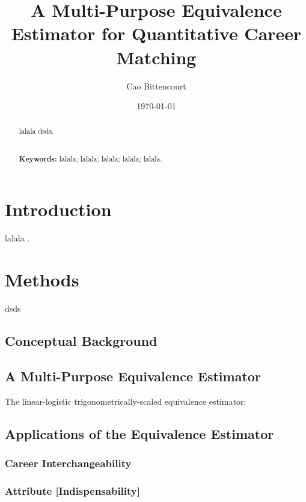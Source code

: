 \documentclass{article}
\title{
    A Multi-Purpose Equivalence Estimator for Quantitative Career Matching
}
\author{Cao Bittencourt}
\date{\today}
\begin{document}
\maketitle

\newpage
\begin{abstract}
    \noindent
    lalala dsds.

    \noindent
    \\ \textbf{Keywords:} lalala; lalala; lalala; lalala; lalala.
\end{abstract}

\newpage
\tableofcontents

\newpage
\listoftables

\newpage
\listoffigures

\newpage
\section{Introduction}
lalala \parencite[]{lalala}.

\section{Methods}
dsds \parencite{dsds}

\subsection{Conceptual Background}

\subsection{A Multi-Purpose Equivalence Estimator}
The linear-logistic trigonometrically-scaled equivalence estimator:
\EquivalenceEstimator

\subsection{Applications of the Equivalence Estimator}
\subsubsection{Career Interchangeability}
\InterchangeabilityFunction

\subsubsection{Attribute [Indispensability]}
\end{document}
